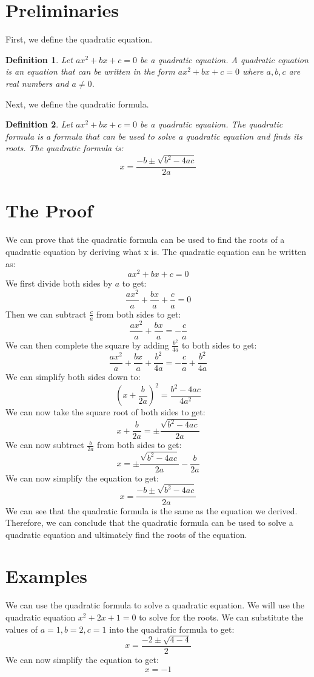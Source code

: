 \documentclass{article}
\newtheorem{Definition}{Definition}
\begin{document}
\section{Preliminaries}
\label{sec:Preliminaries}
First, we define the quadratic equation.
\begin{Definition}
Let $ax^2 + bx + c = 0$ be a quadratic equation. A quadratic equation is an equation that can be written in the form $ax^2 + bx + c = 0$ where $a, b, c$ are real numbers and
$a \neq 0$.
\end{Definition}
Next, we define the quadratic formula.
\begin{Definition}
Let $ax^2 + bx + c = 0$ be a quadratic equation. The quadratic formula is a formula that can be used to solve a quadratic equation and finds its roots. The quadratic formula is:
\[x = \frac{-b \pm \sqrt{b^2 - 4ac}}{2a}\]
\end{Definition}

\section{The Proof}
\label{sec:Proof}
We can prove that the quadratic formula can be used to find the roots of a quadratic equation by 
deriving what x is. The quadratic equation can be written as:
\[ax^2 + bx + c = 0\]
We first divide both sides by $a$ to get:
\[\frac{ax^2}{a} + \frac{bx}{a} + \frac{c}{a} = 0\]
Then we can subtract $\frac{c}{a}$ from both sides to get:
\[\frac{ax^2}{a} + \frac{bx}{a} = -\frac{c}{a}\]
We can then complete the square by adding $\frac{b^2}{4a}$ to both sides to get:
\[\frac{ax^2}{a} + \frac{bx}{a} + \frac{b^2}{4a} = -\frac{c}{a} + \frac{b^2}{4a}\]
We can simplify both sides down to:
\[(x + \frac{b}{2a})^2 = \frac{b^2-4ac}{4a^2}\]    
We can now take the square root of both sides to get:
\[x + \frac{b}{2a} = \pm \frac{\sqrt{b^2-4ac}}{2a}\]
We can now subtract $\frac{b}{2a}$ from both sides to get:
\[x = \pm \frac{\sqrt{b^2-4ac}}{2a} - \frac{b}{2a}\]
We can now simplify the equation to get:
\[x = \frac{-b \pm \sqrt{b^2 - 4ac}}{2a}\]
We can see that the quadratic formula is the same as the equation we derived. Therefore, we can conclude that the quadratic
formula can be used to solve a quadratic equation and ultimately find the roots of the equation. \\


\section{Examples}
\label{sec:Examples}
We can use the quadratic formula to solve a quadratic equation. We will use the quadratic equation $x^2 + 2x + 1 = 0$ to
solve for the roots. We can substitute the values of $a = 1, b = 2, c = 1$ into the quadratic formula to get:
\[x = \frac{-2 \pm \sqrt{4 - 4}}{2}\]
We can now simplify the equation to get:
\[x = -1\]
\end{document}

